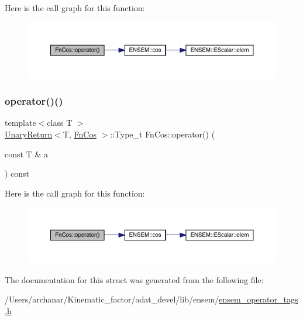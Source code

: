 Here is the call graph for this function\+:
\nopagebreak
\begin{figure}[H]
\begin{center}
\leavevmode
\includegraphics[width=350pt]{d1/d49/structFnCos_aaf33b1555b7687d8c211c90189ef0c5c_cgraph}
\end{center}
\end{figure}
\mbox{\label{structFnCos_aaf33b1555b7687d8c211c90189ef0c5c}} 
\subsubsection{\texorpdfstring{operator()()}{operator()()}\hspace{0.1cm}{\footnotesize\ttfamily [2/2]}}
{\footnotesize\ttfamily template$<$class T $>$ \\
\mbox{\hyperlink{structUnaryReturn}{Unary\+Return}}$<$T, \mbox{\hyperlink{structFnCos}{Fn\+Cos}} $>$\+::Type\+\_\+t Fn\+Cos\+::operator() (\begin{DoxyParamCaption}\item[{const T \&}]{a }\end{DoxyParamCaption}) const\hspace{0.3cm}{\ttfamily [inline]}}

Here is the call graph for this function\+:
\nopagebreak
\begin{figure}[H]
\begin{center}
\leavevmode
\includegraphics[width=350pt]{d1/d49/structFnCos_aaf33b1555b7687d8c211c90189ef0c5c_cgraph}
\end{center}
\end{figure}


The documentation for this struct was generated from the following file\+:\begin{DoxyCompactItemize}
\item 
/\+Users/archanar/\+Kinematic\+\_\+factor/adat\+\_\+devel/lib/ensem/\mbox{\hyperlink{lib_2ensem_2ensem__operator__tags_8h}{ensem\+\_\+operator\+\_\+tags.\+h}}\end{DoxyCompactItemize}
